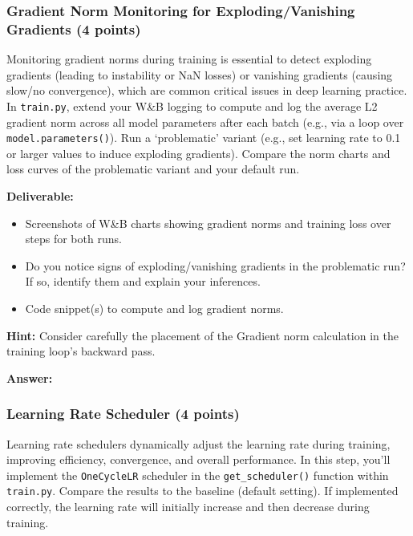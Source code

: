 \documentclass[11pt, oneside]{article}   	%
\begin{document}
\subsubsection*{Gradient Norm Monitoring for Exploding/Vanishing Gradients (4 points)}
Monitoring gradient norms during training is essential to detect exploding gradients (leading to instability or NaN losses) or vanishing gradients (causing slow/no convergence), which are common critical issues in deep learning practice. In \texttt{train.py}, extend your W\&B logging to compute and log the average L2 gradient norm across all model parameters after each batch (e.g., via a loop over \texttt{model.parameters()}). Run a `problematic' variant (e.g., set learning rate to 0.1 or larger values to induce exploding gradients). Compare the norm charts and loss curves of the problematic variant and your default run.

\noindent\textbf{Deliverable:}
\begin{itemize}
\item Screenshots of W\&B charts showing gradient norms and training loss over steps for both runs.
\item Do you notice signs of exploding/vanishing gradients in the problematic run? If so, identify them and explain your inferences. 
\item Code snippet(s) to compute and log gradient norms.
\end{itemize}
\textbf{Hint:} Consider carefully the placement of the Gradient norm calculation in the training loop's backward pass.

\begin{answerbox} \textbf{Answer:} \vspace*{1cm}


\end{answerbox}

\subsubsection*{Learning Rate Scheduler (4 points)}

Learning rate schedulers dynamically adjust the learning rate during training, improving efficiency, convergence, and overall performance. In this step, you'll implement the \texttt{OneCycleLR} scheduler in the \texttt{get\_scheduler()} function within \texttt{train.py}. Compare the results to the baseline (default setting). If implemented correctly, the learning rate will initially increase and then decrease during training.
\end{document}
